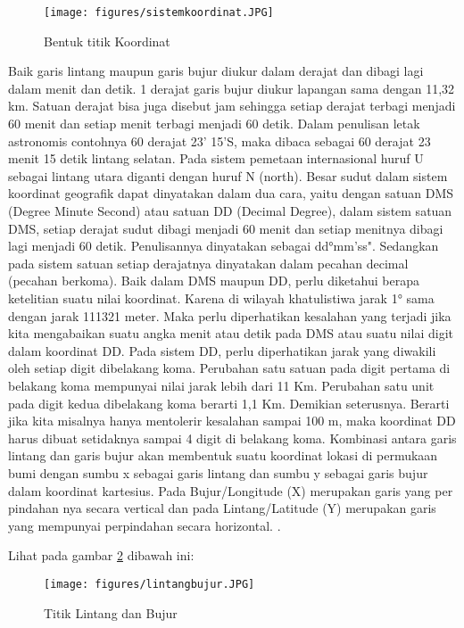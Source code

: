 \begin{figure}[ht]
	\centerline{\texttt{[image: figures/sistemkoordinat.JPG]}}
	\caption{Bentuk titik Koordinat}
	\label{sistemkoordinat}
	\end{figure}


Baik garis lintang maupun garis bujur diukur dalam derajat dan dibagi lagi dalam menit dan detik. 1 derajat garis bujur diukur lapangan sama dengan 11,32 km. Satuan derajat bisa juga disebut jam sehingga setiap derajat terbagi menjadi 60 menit dan setiap menit terbagi menjadi 60 detik. Dalam penulisan letak astronomis contohnya 60 derajat 23' 15'S, maka dibaca sebagai 60 derajat 23 menit 15 detik lintang selatan. Pada sistem pemetaan internasional huruf U sebagai lintang utara diganti dengan huruf N (north). Besar sudut dalam sistem koordinat geografik dapat dinyatakan dalam dua cara, yaitu dengan satuan DMS (Degree Minute Second) atau satuan DD (Decimal Degree), dalam sistem satuan DMS, setiap derajat sudut dibagi menjadi 60 menit dan setiap menitnya dibagi lagi menjadi 60 detik. Penulisannya dinyatakan sebagai dd°mm'ss". Sedangkan pada sistem satuan setiap derajatnya dinyatakan dalam pecahan decimal (pecahan berkoma). Baik dalam DMS maupun DD, perlu diketahui berapa ketelitian suatu nilai koordinat. Karena di wilayah khatulistiwa jarak 1° sama dengan jarak 111321 meter. Maka perlu diperhatikan kesalahan yang terjadi jika kita mengabaikan suatu angka menit atau detik pada DMS atau suatu nilai digit dalam koordinat DD. Pada sistem DD, perlu diperhatikan jarak yang diwakili oleh setiap digit dibelakang koma. Perubahan satu satuan pada digit pertama di belakang koma mempunyai nilai jarak lebih dari 11 Km. Perubahan satu unit pada digit kedua dibelakang koma berarti 1,1 Km. Demikian seterusnya. Berarti jika kita misalnya hanya mentolerir kesalahan sampai 100 m, maka koordinat DD harus dibuat setidaknya sampai 4 digit di belakang koma. Kombinasi antara garis lintang dan garis bujur akan membentuk suatu koordinat lokasi di permukaan bumi dengan sumbu x sebagai garis lintang dan sumbu y sebagai garis bujur dalam koordinat kartesius. Pada Bujur/Longitude (X) merupakan garis yang per pindahan nya secara vertical dan pada Lintang/Latitude (Y) merupakan garis yang mempunyai perpindahan secara horizontal. \cite{zuhdi2012sistem}.

Lihat pada gambar \ref{lintang bujur} dibawah ini:

\begin{figure}[ht]
	\centerline{\texttt{[image: figures/lintangbujur.JPG]}}
	\caption{Titik Lintang dan Bujur}
	\label{lintang bujur}
	\end{figure}

